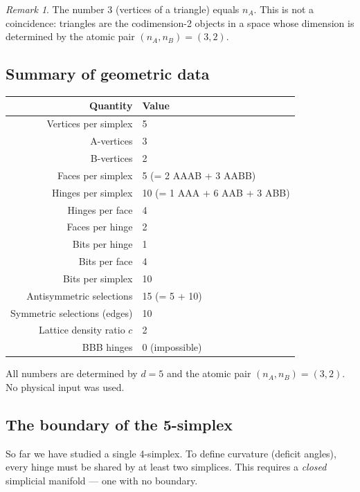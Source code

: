 \documentclass[12pt]{article}
\theoremstyle{remark}
\newtheorem{remark}[theorem]{Remark}
\theoremstyle{definition}
\begin{document}
\begin{remark}
The number 3 (vertices of a triangle) equals $n_A$. This is not a coincidence: triangles are the codimension-2 objects in a space whose dimension is determined by the atomic pair $(n_A, n_B) = (3, 2)$.
\end{remark}

\subsection{Summary of geometric data}

\begin{center}
\begin{tabular}{rl}
\hline
Quantity & Value \\
\hline
Vertices per simplex & 5 \\
A-vertices & 3 \\
B-vertices & 2 \\
Faces per simplex & 5 (= 2 AAAB + 3 AABB) \\
Hinges per simplex & 10 (= 1 AAA + 6 AAB + 3 ABB) \\
Hinges per face & 4 \\
Faces per hinge & 2 \\
Bits per hinge & 1 \\
Bits per face & 4 \\
Bits per simplex & 10 \\
Antisymmetric selections & 15 (= 5 + 10) \\
Symmetric selections (edges) & 10 \\
Lattice density ratio $c$ & 2 \\
BBB hinges & 0 (impossible) \\
\hline
\end{tabular}
\end{center}

All numbers are determined by $d = 5$ and the atomic pair $(n_A, n_B) = (3, 2)$. No physical input was used.

\subsection{The boundary of the 5-simplex}
\label{sec:boundary_5simplex}

So far we have studied a single 4-simplex.  To define curvature (deficit angles), every hinge must be shared by at least two simplices.  This requires a \emph{closed} simplicial manifold --- one with no boundary.
\end{document}
